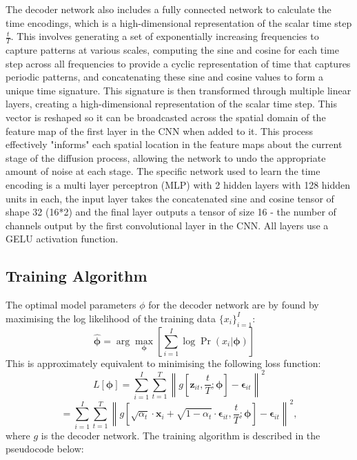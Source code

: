 \documentclass[11pt]{article}
\begin{document}
The decoder network also includes a fully connected network to calculate the time encodings, which is a high-dimensional representation of the scalar time step $\frac{t}{T}$. This involves generating a set of exponentially increasing frequencies to capture patterns at various scales, computing the sine and cosine for each time step across all frequencies to provide a cyclic representation of time that captures periodic patterns, and concatenating these sine and cosine values to form a unique time signature. This signature is then transformed through multiple linear layers, creating a high-dimensional representation of the scalar time step. This vector is reshaped so it can be broadcasted across the spatial domain of the feature map of the first layer in the CNN when added to it. This process effectively "informs" each spatial location in the feature maps about the current stage of the diffusion process, allowing the network to undo the appropriate amount of noise at each stage. The specific network used to learn the time encoding is a multi layer perceptron (MLP) with 2 hidden layers with 128 hidden units in each, the input layer takes the concatenated sine and cosine tensor of shape 32 (16*2) and the final layer outputs a tensor of size 16 - the number of channels output by the first convolutional layer in the CNN. All layers use a GELU activation function.

\subsection{Training Algorithm}
The optimal model parameters $\phi$ for the decoder network are by found by maximising the log likelihood of the training data $\{x_i\}_{i=1}^{I}$:
$$\hat{\boldsymbol{\phi}} = \arg\max_{\boldsymbol{\phi}} \left[ \sum_{i=1}^{I} \log \Pr(x_i | \boldsymbol{\phi}) \right] \quad$$
This is approximately equivalent to minimising the following loss function:
$$
L[\boldsymbol{\phi}] = \sum_{i=1}^{I} \sum_{t=1}^{T} \left\| g[\mathbf{z}_{it}, \frac{t}{T}; \boldsymbol{\phi}] - \boldsymbol{\epsilon}_{it} \right\|^2
$$
\begin{equation}
= \sum_{i=1}^{I} \sum_{t=1}^{T} \left\| g \left[\sqrt{\alpha_t} \cdot \mathbf{x}_i + \sqrt{1 - \alpha_t} \cdot \boldsymbol{\epsilon}_{it}, \frac{t}{T}; \boldsymbol{\phi} \right] - \boldsymbol{\epsilon}_{it} \right\|^2,
\label{eq:loss_function}
\end{equation}
where $g$ is the decoder network. The training algorithm is described in the pseudocode below:
\end{document}
